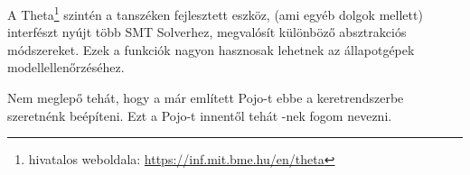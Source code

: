 A Theta\footnote{hivatalos weboldala: \url{https://inf.mit.bme.hu/en/theta}} szintén a tanszéken fejlesztett eszköz, (ami egyéb dolgok mellett) interfészt nyújt több SMT Solverhez, megvalósít különböző absztrakciós módszereket. Ezek a funkciók nagyon hasznosak lehetnek az állapotgépek modellellenőrzéséhez.

Nem meglepő tehát, hogy a már említett Pojo-t ebbe a keretrendszerbe szeretnénk beépíteni. Ezt a Pojo-t innentől tehát {\thetaSc}-nek fogom nevezni. 